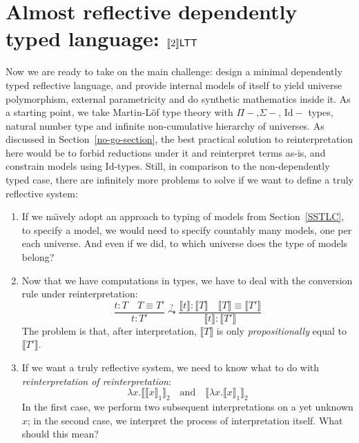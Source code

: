 \section{Almost reflective dependently typed language:
    \texorpdfstring{$\llbracket 2\rrbracket\mathsf{LTT}$}{[[2]]LTT}}
\label{twoLTT}

Now we are ready to take on the main challenge: design
a minimal dependently typed reflective language, and
provide internal models of itself to yield universe
polymorphism, external parametricity and do synthetic
mathematics inside it. As a starting point, we take
Martin-L\"of type theory with $\Pi-$,$\Sigma-$,
$\mathrm{Id}-$ types, natural number type and infinite
non-cumulative hierarchy of universes. As discussed in
Section~\ref{no-go-section}, the best practical
solution to reinterpretation here would be to forbid
reductions under it and reinterpret terms as-is, and
constrain models using $\mathrm{Id}$-types. Still, in
comparison to the non-dependently typed case, there are
infinitely more problems to solve if we want to define
a truly reflective system:

\begin{enumerate}
    \item If we na\"{\i}vely adopt an approach to
        typing of models from Section~\ref{SSTLC}, to
        specify a model, we would need to
        specify countably many models, one per each
        universe. And even if we did, to which universe
        does the type of models belong?
    \item Now that we have computations in types, we
        have to deal with the conversion rule under
        reinterpretation:
        \[
            \dfrac{t:T\quad T\equiv T'}{t:T'}
            \stackrel{?}{\leadsto}
            \dfrac{\llbracket t\rrbracket:\llbracket T
            \rrbracket\quad\llbracket T\rrbracket\equiv
            \llbracket T'\rrbracket}{\llbracket t
            \rrbracket:\llbracket T'\rrbracket}
        \]
        The problem is that, after interpretation,
        $\llbracket T \rrbracket$ is only
        \textit{propositionally} equal to $\llbracket
        T'\rrbracket$.
    \item If we want a truly reflective system, we need
        to know what to do with
        \textit{reinterpretation of reinterpretation}:
        \[
            \lambda x.\llbracket\llbracket x
            \rrbracket_1\rrbracket_2
            \quad\text{and}\quad
            \llbracket\lambda x.\llbracket x
            \rrbracket_1\rrbracket_2
        \]
        In the first case, we perform two subsequent
        interpretations on a yet unknown $x$; in the
        second case, we interpret the process of
        interpretation itself. What should this mean?
\end{enumerate}

